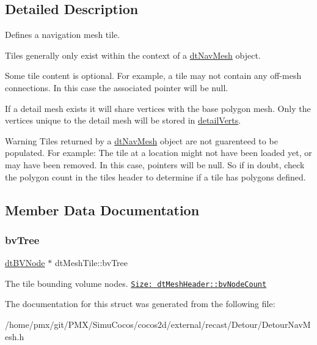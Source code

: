 \subsection{Detailed Description}
Defines a navigation mesh tile.

\begin{DoxyParagraph}{}

\end{DoxyParagraph}
Tiles generally only exist within the context of a \hyperlink{classdtNavMesh}{dt\+Nav\+Mesh} object.

Some tile content is optional. For example, a tile may not contain any off-\/mesh connections. In this case the associated pointer will be null.

If a detail mesh exists it will share vertices with the base polygon mesh. Only the vertices unique to the detail mesh will be stored in \hyperlink{structdtMeshTile_a916cb93915400b3a0edabe9c2206c670}{detail\+Verts}.

\begin{DoxyWarning}{Warning}
Tiles returned by a \hyperlink{classdtNavMesh}{dt\+Nav\+Mesh} object are not guarenteed to be populated. For example\+: The tile at a location might not have been loaded yet, or may have been removed. In this case, pointers will be null. So if in doubt, check the polygon count in the tile\textquotesingle{}s header to determine if a tile has polygons defined. 
\end{DoxyWarning}


\subsection{Member Data Documentation}
\mbox{\label{structdtMeshTile_a3f95d402afe888c121e4ed155a739f8e}} 
\subsubsection{\texorpdfstring{bv\+Tree}{bvTree}}
{\footnotesize\ttfamily \hyperlink{structdtBVNode}{dt\+B\+V\+Node} $\ast$ dt\+Mesh\+Tile\+::bv\+Tree}

The tile bounding volume nodes. \href{Will be null if bounding volumes are disabled.}{\tt Size\+: dt\+Mesh\+Header\+::bv\+Node\+Count} 

The documentation for this struct was generated from the following file\+:\begin{DoxyCompactItemize}
\item 
/home/pmx/git/\+P\+M\+X/\+Simu\+Cocos/cocos2d/external/recast/\+Detour/Detour\+Nav\+Mesh.\+h\end{DoxyCompactItemize}
